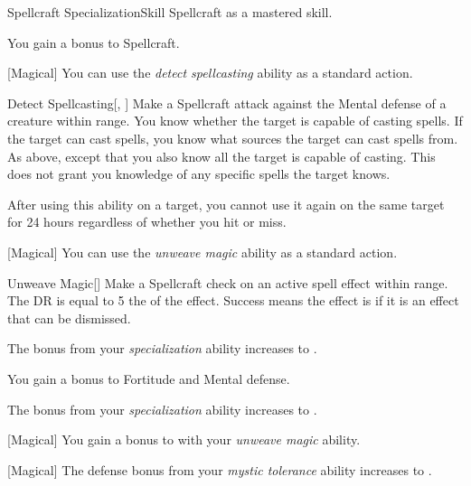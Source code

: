     \begin{feat}{Spellcraft Specialization}{Skill}
        \featpre Spellcraft as a mastered skill.

         You gain a  bonus to Spellcraft.

        [Magical] You can use the \textit{detect spellcasting} ability as a standard action.
        \begin{apability}{Detect Spellcasting}[, ]
            Make a Spellcraft attack against the Mental defense of a creature within \rngmed range.
            \hit You know whether the target is capable of casting spells.
            If the target can cast spells, you know what sources the target can cast spells from.
            \crit As above, except that you also know all  the target is capable of casting.
            This does not grant you knowledge of any specific spells the target knows.

            After using this ability on a target, you cannot use it again on the same target for 24 hours regardless of whether you hit or miss.
        \end{apability}

        [Magical] You can use the \textit{unweave magic} ability as a standard action.
        \begin{apability}{Unweave Magic}[]
            Make a Spellcraft check on an active spell effect within \rngmed range.
            The DR is equal to 5 \add the  of the effect.
            Success means the effect is  if it is an effect that can be dismissed.
        \end{apability}

         The bonus from your \textit{specialization} ability increases to .

         You gain a  bonus to Fortitude and Mental defense.

         The bonus from your \textit{specialization} ability increases to .

        [Magical] You gain a  bonus to  with your \textit{unweave magic} ability.

        [Magical] The defense bonus from your \textit{mystic tolerance} ability increases to .
    \end{feat}

